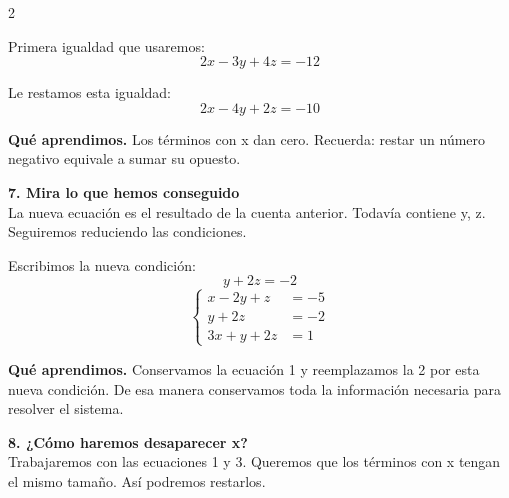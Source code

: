 \documentclass[11pt,a4paper,landscape]{article}
\begin{document}
\begin{multicols*}{2}
\begin{minipage}{\linewidth}
\par{}\par\smallskip
\par\smallskip Primera igualdad que usaremos:
\[2x - 3y + 4z = -12\]
\par\smallskip Le restamos esta igualdad:
\[2x - 4y + 2z = -10\]
\par\smallskip\textbf{Qué aprendimos.} Los términos con x dan cero. Recuerda: restar un número negativo equivale a sumar su opuesto.
\end{minipage}\par\medskip
\noindent\begin{minipage}{\linewidth}\textbf{7. Mira lo que hemos conseguido}\\[2pt]La nueva ecuación es el resultado de la cuenta anterior. Todavía contiene y, z. Seguiremos reduciendo las condiciones.
\par\smallskip Escribimos la nueva condición:
\[y + 2z = -2\]
\[\left\{\begin{aligned}x - 2y + z &= -5\\y + 2z &= -2\\3x + y + 2z &= 1\end{aligned}\right.\]
\par\smallskip\textbf{Qué aprendimos.} Conservamos la ecuación 1 y reemplazamos la 2 por esta nueva condición. De esa manera conservamos toda la información necesaria para resolver el sistema.
\end{minipage}\par\medskip
\noindent\begin{minipage}{\linewidth}\textbf{8. ¿Cómo haremos desaparecer x?}\\[2pt]Trabajaremos con las ecuaciones 1 y 3. Queremos que los términos con x tengan el mismo tamaño. Así podremos restarlos.

\end{minipage}
\end{multicols*}
\end{document}
